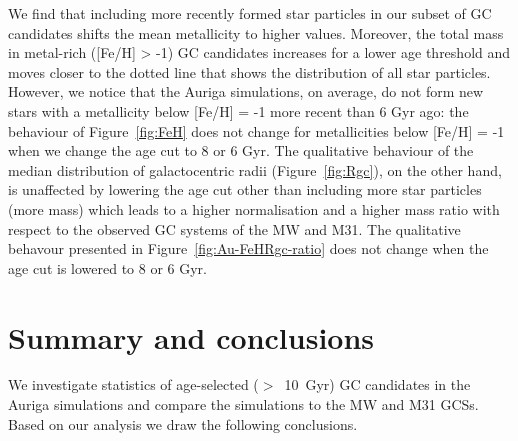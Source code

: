 \documentclass[a4paper,fleqn,usenatbib]{mnras}
\begin{document}
We find that including more recently formed star particles in our subset 
of GC candidates shifts the mean metallicity to higher values. Moreover, the
total mass in metal-rich ([Fe/H] > -1) GC candidates increases for a lower age 
threshold and moves closer to the dotted line that shows the distribution of
all star particles. However, we notice that the Auriga simulations, on average, 
do not form new stars with a metallicity below [Fe/H] = -1 more recent than 6 Gyr 
ago: the behaviour of Figure~\ref{fig:FeH} does not change for metallicities
below [Fe/H] = -1 when we change the age cut to 8 or 6 Gyr. The qualitative behaviour
of the median distribution of galactocentric radii (Figure~\ref{fig:Rgc}), on 
the other hand, is unaffected by lowering the age cut other than including
more star particles (more mass) which leads to a higher normalisation and
a higher mass ratio with respect to the observed GC systems of the MW and M31.
The qualitative behavour presented in Figure~\ref{fig:Au-FeHRgc-ratio} does not 
change when the age cut is lowered to 8 or 6 Gyr.



\section{Summary and conclusions}
\label{sec:conclusions}

We investigate statistics of age-selected ($>$~10~Gyr) GC candidates in the 
Auriga simulations and compare the simulations to the MW and M31 GCSs. Based on
our analysis we draw the following conclusions.
\end{document}
